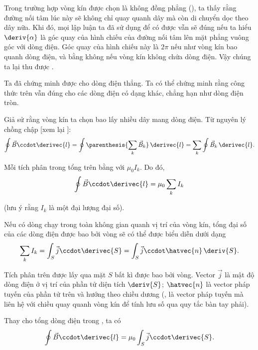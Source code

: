 Trong trường hợp vòng kín được chọn là không đồng phẳng (), ta thấy rằng đường nối tâm lúc này sẽ không chỉ quay quanh dây mà còn di chuyển dọc theo dây nữa. Khi đó, mọi lập luận ta đã sử dụng để có được  vẫn sẽ đúng nếu ta hiểu $\deriv{\alpha}$ là góc quay của hình chiếu của đường nối tâm lên mặt phẳng vuông góc với dòng điện. Góc quay của hình chiếu này là $2\pi$ nếu như vòng kín bao quanh dòng điện, và bằng không nếu vòng kín không chứa dòng điện. Vậy chúng ta lại thu được .

Ta đã chứng minh được  cho dòng điện thẳng. Ta có thể chứng minh rằng công thức trên vẫn đúng cho các dòng điện có dạng khác, chẳng hạn như dòng điện tròn.

Giả sử rằng vòng kín ta chọn bao lấy nhiều dây mang dòng điện. Từ nguyên lý chồng chập [xem lại ]:
\begin{equation*}
    \oint \vec{B}\ccdot \derivec{l} = \oint \parenthesis{ \sum_k \vec{B}_k }\, \derivec{l} = \sum_k \oint \vec{B}_k\, \derivec{l}.
\end{equation*}

\noindent
Mỗi tích phân trong tổng trên bằng với $\mu_0I_k$. Do đó,
\begin{equation}\label{eq:6_101}
    \oint \vec{B}\ccdot \derivec{l} = \mu_0 \sum_k I_k
\end{equation}

\noindent
(lưu ý rằng $I_k$ là một đại lượng đại số).

Nếu có dòng chạy trong toàn không gian quanh vị trí của vòng kín, tổng đại số của các dòng điện được bao bởi vòng sẽ có thể được biểu diễn dưới dạng
\begin{equation}\label{eq:6_102}
    \sum_k I_k = \int_S \vec{j}\ccdot \derivec{S} = \int_S \vec{j}\ccdot \hatvec{n}\, \deriv{S}.
\end{equation}

\noindent
Tích phân trên được lấy qua mặt $S$ bất kì được bao bởi vòng. Vector $\vec{j}$ là mật độ dòng điện ở vị trí của phần tử diện tích $\deriv{S}$; $\hatvec{n}$ là vector pháp tuyến của phần tử trên và hướng theo chiều dương (\ie, là vector pháp tuyến mà liên hệ với chiều quay quanh vòng kín để tính lưu số qua quy tắc bàn tay phải).

Thay  cho tổng dòng điện trong , ta có 
\begin{equation*}
    \oint \vec{B}\ccdot \derivec{l} = \mu_0 \int_S \vec{j}\ccdot \derivec{S}.
\end{equation*}

